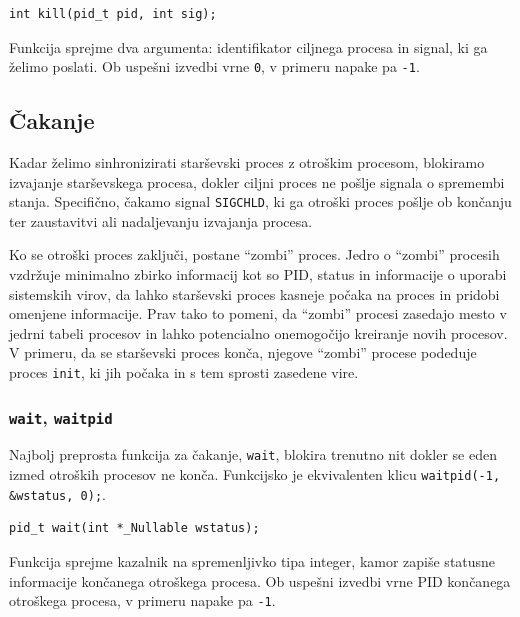 \documentclass[a4paper,12pt,openright]{book}
\begin{document}
\begin{lstlisting}[style=func]
 int kill(pid_t pid, int sig);
\end{lstlisting}

Funkcija sprejme dva argumenta: identifikator ciljnega procesa in signal, ki ga želimo poslati.
Ob uspešni izvedbi vrne \texttt{0}, v primeru napake pa \texttt{-1}.

\subsection{Čakanje} \label{ssec:linux_syscalls:waiting}

Kadar želimo sinhronizirati starševski proces z otroškim procesom, blokiramo izvajanje starševskega procesa, dokler ciljni proces ne pošlje signala o spremembi stanja.
Specifično, čakamo signal \texttt{SIGCHLD}, ki ga otroški proces pošlje ob končanju ter zaustavitvi ali nadaljevanju izvajanja procesa.

Ko se otroški proces zaključi, postane ``zombi'' proces.
Jedro o ``zombi'' procesih vzdržuje minimalno zbirko informacij kot so PID, status in informacije o uporabi sistemskih virov, da lahko starševski proces kasneje počaka na proces in pridobi omenjene informacije.
Prav tako to pomeni, da ``zombi'' procesi zasedajo mesto v jedrni tabeli procesov in lahko potencialno onemogočijo kreiranje novih procesov.
V primeru, da se starševski proces konča, njegove ``zombi'' procese podeduje proces \texttt{init}, ki jih počaka in s tem sprosti zasedene vire.

\subsubsection{\texttt{wait}, \texttt{waitpid}}

Najbolj preprosta funkcija za čakanje, \texttt{wait}, blokira trenutno nit dokler se eden izmed otroških procesov ne konča.
Funkcijsko je ekvivalenten klicu \verb|waitpid(-1, &wstatus, 0);|.

\begin{lstlisting}[style=func]
 pid_t wait(int *_Nullable wstatus);
\end{lstlisting}

Funkcija sprejme kazalnik na spremenljivko tipa integer, kamor zapiše statusne informacije končanega otroškega procesa.
Ob uspešni izvedbi vrne PID končanega otroškega procesa, v primeru napake pa \texttt{-1}.
\end{document}
